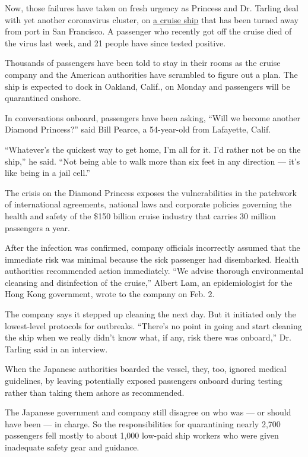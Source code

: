 Now, those failures have taken on fresh urgency as Princess and Dr.
Tarling deal with yet another coronavirus cluster, on
\href{https://www.nytimes3xbfgragh.onion/2020/03/06/us/california-coronavirus-cruise-ship.html}{a
cruise ship} that has been turned away from port in San Francisco. A
passenger who recently got off the cruise died of the virus last week,
and 21 people have since tested positive.

Thousands of passengers have been told to stay in their rooms as the
cruise company and the American authorities have scrambled to figure out
a plan. The ship is expected to dock in Oakland, Calif., on Monday and
passengers will be quarantined onshore.

In conversations onboard, passengers have been asking, ``Will we become
another Diamond Princess?'' said Bill Pearce, a 54-year-old from
Lafayette, Calif.

``Whatever's the quickest way to get home, I'm all for it. I'd rather
not be on the ship,'' he said. ``Not being able to walk more than six
feet in any direction --- it's like being in a jail cell.''

The crisis on the Diamond Princess exposes the vulnerabilities in the
patchwork of international agreements, national laws and corporate
policies governing the health and safety of the \$150 billion cruise
industry that carries 30 million passengers a year.

After the infection was confirmed, company officials incorrectly assumed
that the immediate risk was minimal because the sick passenger had
disembarked. Health authorities recommended action immediately. ``We
advise thorough environmental cleansing and disinfection of the
cruise,'' Albert Lam, an epidemiologist for the Hong Kong government,
wrote to the company on Feb. 2.

The company says it stepped up cleaning the next day. But it initiated
only the lowest-level protocols for outbreaks. ``There's no point in
going and start cleaning the ship when we really didn't know what, if
any, risk there was onboard,'' Dr. Tarling said in an interview.

When the Japanese authorities boarded the vessel, they, too, ignored
medical guidelines, by leaving potentially exposed passengers onboard
during testing rather than taking them ashore as recommended.

The Japanese government and company still disagree on who was --- or
should have been --- in charge. So the responsibilities for quarantining
nearly 2,700 passengers fell mostly to about 1,000 low-paid ship workers
who were given inadequate safety gear and guidance.

